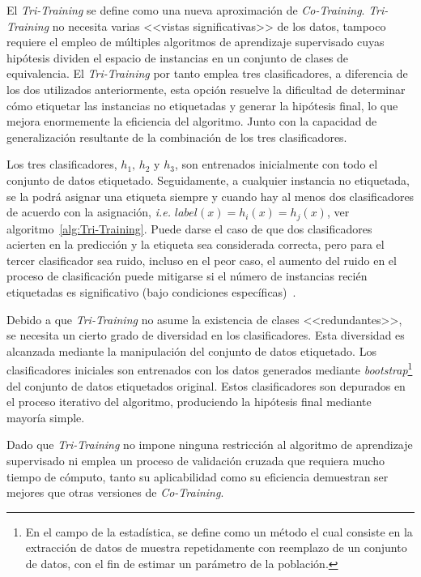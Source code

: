 El \textit{Tri-Training} se define como una nueva aproximación de \textit{Co-Training}. \textit{Tri-Training} no necesita varias <<vistas significativas>> de los datos, tampoco requiere el empleo de múltiples algoritmos de aprendizaje supervisado cuyas hipótesis dividen el espacio de instancias en un conjunto de clases de equivalencia. El \textit{Tri-Training} por tanto emplea tres clasificadores, a diferencia de los dos utilizados anteriormente, esta opción resuelve la dificultad de determinar cómo etiquetar las instancias no etiquetadas y generar la hipótesis final, lo que mejora enormemente la eficiencia del algoritmo. Junto con la capacidad de generalización resultante de la combinación de los tres clasificadores.

Los tres clasificadores, $h_1\text{, } h_2 \text{ y } h_3$, son entrenados inicialmente con todo el conjunto de datos etiquetado. Seguidamente, a cualquier instancia no etiquetada, se la podrá asignar una etiqueta siempre y cuando hay al menos dos clasificadores de acuerdo con la asignación, \textit{i.e.} $label(x) = h_i(x) =  h_j(x)$, ver~ algoritmo~\ref{alg:Tri-Training}. Puede darse el caso de que dos clasificadores acierten en la predicción y la etiqueta sea considerada correcta, pero para el tercer clasificador sea ruido, incluso en el peor caso, el aumento del ruido en el proceso de clasificación puede mitigarse si el número de instancias recién etiquetadas es significativo (bajo condiciones específicas)~\cite{zhou2005tri}.

Debido a que \textit{Tri-Training} no asume la existencia de clases <<redundantes>>, se necesita un cierto grado de diversidad en los clasificadores. Esta diversidad es alcanzada mediante la manipulación del conjunto de datos etiquetado. Los clasificadores iniciales son entrenados con los datos generados mediante \textit{bootstrap}\footnote{En el campo de la estadística, se define como un método el cual consiste en la extracción de datos de muestra repetidamente con reemplazo de un conjunto de datos, con el fin de estimar un parámetro de la población.} del conjunto de datos etiquetados original. Estos clasificadores son depurados en el proceso iterativo del algoritmo, produciendo la hipótesis final mediante mayoría simple.

Dado que \textit{Tri-Training} no impone ninguna restricción al algoritmo de aprendizaje supervisado ni emplea un proceso de validación cruzada que requiera mucho tiempo de cómputo, tanto su aplicabilidad como su eficiencia demuestran ser mejores que otras versiones de \textit{Co-Training}.

